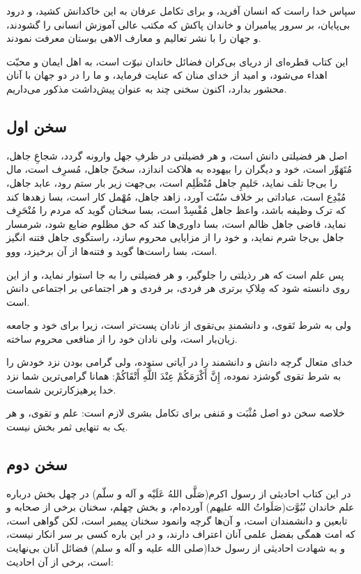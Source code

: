 سپاس خدا راست که انسان آفرید، و برای تکامل عرفان به این خاکدانش کشید،
و درود بی‌پایان، بر سرور پیامبران و خاندان پاکش که مکتب عالی آموزش
انسانی را گشودند، و جهان را با نشر تعالیم و معارف الاهی بوستان معرفت
نمودند.

این کتاب قطره‌ای از دریای بی‌کران فضائل خاندان نبوّت است، به اهل ایمان و
محبّت اهداء می‌شود، و امید از خدای منان که عنایت فرماید، و ما را در دو
جهان با آنان محشور بدارد، اکنون سخنی چند به عنوان پیش‌داشت مذکور
می‌داریم.

\subsection*{سخن اول}

اصل هر فضیلتی دانش است، و هر فضیلتی در ظرفِ جهل وارونه گردد، شجاعِ جاهل،
مُتَهَوِّر است، خود و دیگران را بیهوده به هلاکت اندازد، سخیِّ جاهل، مُسرِف است،
مال را بی‌جا تلف نماید، حَلیمِ جاهل مُنْظَلِم است، بی‌جهت زیر بار ستم رود،
عابد جاهل، مُبْدِع است، عباداتی بر خلاف سُنّت آورد، زاهد جاهل، مُهْمل کار
است، بسا زهدها کند که ترک وظیفه باشد، واعظ جاهل مُفْسِدْ است، بسا سخنان
گوید که مردم را مُنْحَرِف نماید، قاضی جاهل ظالم است، بسا داوری‌ها کند که حق
مظلوم ضایع شود، شرمسار جاهل بی‌جا شرم نماید، و خود را از مزایایی محروم
سازد، راستگوی جاهل فتنه انگیز است، بسا راست‌ها گوید و فتنه‌ها از آن
برخیزد، ووو.

پس علم است که هر رذیلتی را جلوگیر، و هر فضیلتی را به جا استوار نماید،
و از این روی دانسته شود که مِلاکِ برتری هر فردی، بر فردی و هر اجتماعی بر
اجتماعی دانش است.

ولی به شرط تَقوی، و دانشمندِ بی‌تقوی از نادان پست‌تر است، زیرا برای خود و
جامعه زیان‌‌بار است، ولی نادان خود را از منافعی محروم ساخته.

خدای متعال گرچه دانش و دانشمند را در آیاتی ستوده، ولی گرامی بودن نزد
خودش را به شرط تقوی گوشزد نموده، إِنَّ أَكْرَمَكُمْ عِنْدَ اللَّهِ أَتْقَاكُمْ: همانا
گرامی‌ترین شما نزد خدا پرهیزکارترین شماست.

خلاصه سخن دو اصل مُثْبَت و مَنفی برای تکامل بشری لازم است: علم و تقوی، و
هر یک به تنهایی ثمر بخش نیست.

\subsection*{سخن دوم}

در این کتاب احادیثی از رسول اکرم(صَلَّی اللهُ عَلَیْه و آله و سلّم) در چهل بخش
درباره علم خاندان نُبُوَّت(صَلَواتُ الله علیهم) آورده‌ام، و بخش چهلم، سخنان
برخی از صحابه و تابعین و دانشمندان است، و آن‌ها گرچه وانمود سخنان پیمبر
است، لکن گواهی است، که امت همگی بفضل علمی آنان اعتراف دارند، و در این
باره کسی بر سر انکار نیست، و به شهادت احادیثی از رسول خدا(صلی الله
علیه و آله و سلم) فضائل آنان بی‌نهایت است، برخی از آن احادیث:

